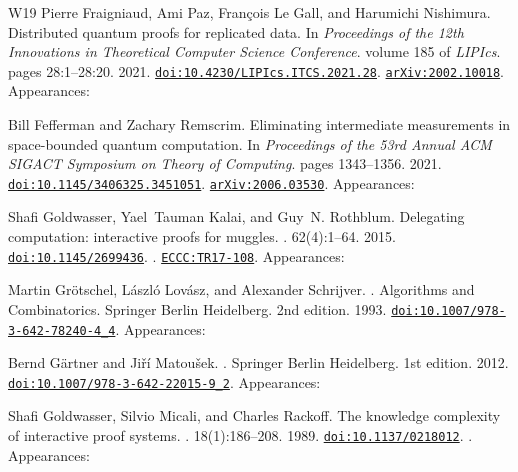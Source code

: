 \documentclass[10pt,a4paper]{article}
\numberwithin{equation}{section}
\numberwithin{figure}{section}
\begin{document}
\begin{thebibliography}{{}W19}
Pierre Fraigniaud, Ami Paz, Fran{\c{c}}ois {Le Gall}, and Harumichi Nishimura.
\newblock Distributed quantum proofs for replicated data.
\newblock In {\em Proceedings of the 12th Innovations in Theoretical Computer Science Conference}. volume 185 of {\em LIPIcs}. pages 28:1--28:20. 2021.
\newblock \href {https://doi.org/10.4230/LIPIcs.ITCS.2021.28} {\texttt{doi:10.4230/LIPIcs.ITCS.2021.28}}. \href {https://arxiv.org/abs/2002.10018} {\texttt{arXiv:2002.10018}}. Appearances:\!

Bill Fefferman and Zachary Remscrim.
\newblock Eliminating intermediate measurements in space-bounded quantum computation.
\newblock In {\em Proceedings of the 53rd Annual ACM SIGACT Symposium on Theory of Computing}. pages 1343--1356. 2021.
\newblock \href {https://doi.org/10.1145/3406325.3451051} {\texttt{doi:10.1145/3406325.3451051}}. \href {https://arxiv.org/abs/2006.03530} {\texttt{arXiv:2006.03530}}. Appearances:\!

Shafi Goldwasser, Yael~Tauman Kalai, and Guy~N. Rothblum.
\newblock Delegating computation: interactive proofs for muggles.
. 62(4):1--64. 2015.
\newblock \href {https://doi.org/10.1145/2699436} {\texttt{doi:10.1145/2699436}}. . \href {https://eccc.weizmann.ac.il/report/2017/108} {\texttt{ECCC:TR17-108}}. Appearances:\!

Martin Gr{\"o}tschel, L{\'a}szl{\'o} Lov{\'a}sz, and Alexander Schrijver.
.
\newblock Algorithms and Combinatorics. Springer Berlin Heidelberg. 2nd edition. 1993.
\newblock \href {https://doi.org/10.1007/978-3-642-78240-4\_4} {\texttt{doi:10.1007/978-3-642-78240-4\_4}}. Appearances:\!

Bernd G{\"a}rtner and Ji{\v{r}}{\'i} Matou{\v{s}}ek.
.
\newblock Springer Berlin Heidelberg. 1st edition. 2012.
\newblock \href {https://doi.org/10.1007/978-3-642-22015-9\_2} {\texttt{doi:10.1007/978-3-642-22015-9\_2}}. Appearances:\!

Shafi Goldwasser, Silvio Micali, and Charles Rackoff.
\newblock The knowledge complexity of interactive proof systems.
. 18(1):186--208. 1989.
\newblock \href {https://doi.org/10.1137/0218012} {\texttt{doi:10.1137/0218012}}. . Appearances:\!


\end{thebibliography}
\end{document}
